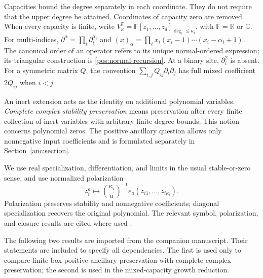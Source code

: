 \documentclass[reqno]{amsart}
\theoremstyle{definition}
\theoremstyle{remark}
\newcommand{\C}{\mathbb C}
\newcommand{\R}{\mathbb R}
\begin{document}
Capacities bound the degree separately in each coordinate. They do not
require that the upper degree be attained. Coordinates of capacity zero
are removed. When every capacity is finite, write
\(V_\kappa^{\mathbb F}=\mathbb F[z_1,\ldots,z_d]_{\deg_i\le\kappa_i}\),
with \(\mathbb F=\R\) or \(\C\). For multi-indices,
\(\partial^\alpha=\prod_i\partial_i^{\alpha_i}\) and
\((x)_\alpha=\prod_i x_i(x_i-1)\cdots(x_i-\alpha_i+1)\).
The canonical order of an operator refers to its unique normal-ordered
expression; its triangular construction is \eqref{pos:normal-recursion}.
At a binary site, \(\partial_i^2\) is absent. For a symmetric matrix
\(Q\), the convention \(\sum_{i,j}Q_{ij}\partial_i\partial_j\)
has full mixed coefficient \(2Q_{ij}\) when \(i<j\).

An inert extension acts as the identity on additional polynomial
variables. \emph{Complete complex stability preservation} means
preservation after every finite collection of inert variables with
arbitrary finite degree bounds. This notion concerns polynomial zeros.
The positive ancillary question allows only nonnegative input
coefficients and is formulated separately in Section~\ref{anc:section}.

We use real specialization, differentiation, and limits in the usual
stable-or-zero sense, and use normalized polarization
\[
 z_i^a\longmapsto \binom{\kappa_i}{a}^{-1}
 e_a(z_{i1},\ldots,z_{i\kappa_i}).
\]
Polarization preserves stability and nonnegative coefficients; diagonal
specialization recovers the original polynomial. The relevant symbol,
polarization, and closure results are cited where used
\cite{BB09,BB10,BB10II,BBL09,LVR10}.

The following two results are imported from the companion manuscript.
Their statements are included to specify all dependencies. The first
is used only to compare finite-box positive ancillary preservation with
complete complex preservation; the second is used in the mixed-capacity
growth reduction.
\end{document}
